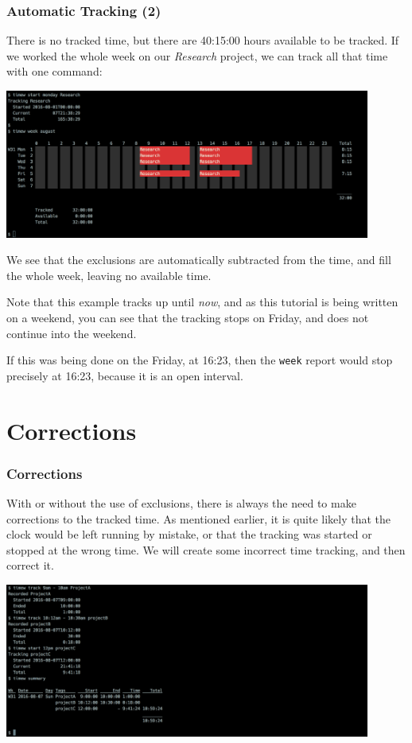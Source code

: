 \documentclass[t,handout]{beamer}
\begin{document}
\begin{frame}[fragile]\frametitle{Automatic Tracking (2)}
    There is no tracked time, but there are 40:15:00 hours available to be tracked.  If we worked the whole week on our \textit{Research} project, we can track all that time with one command:

    \includegraphics[width=12cm]{images/tutorial36.png}

    We see that the exclusions are automatically subtracted from the time, and fill the whole week, leaving no available time.

    Note that this example tracks up until \textit{now}, and as this tutorial is being written on a weekend, you can see that the tracking stops on Friday, and does not continue into the weekend.

    If this was being done on the Friday, at 16:23, then the \verb=week= report would stop precisely at 16:23, because it is an open interval.
\end{frame}

\section{Corrections}

\begin{frame}[fragile]\frametitle{Corrections}
    With or without the use of exclusions, there is always the need to make corrections to the tracked time. As mentioned earlier, it is quite likely that the clock would be left running by mistake, or that the tracking was started or stopped at the wrong time. We will create some incorrect time tracking, and then correct it.

    \includegraphics[width=12cm]{images/tutorial37.png}
\end{frame}
\end{document}
